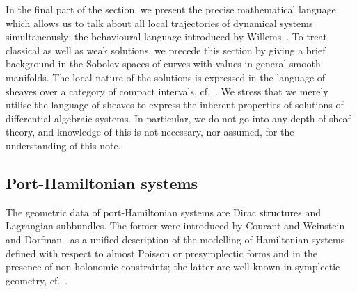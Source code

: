 \documentclass[preprint,12pt]{elsarticle}
\theoremstyle{definition}
\begin{document}
In the final part of the section, we present the precise mathematical language which allows us to talk about all local trajectories of dynamical systems simultaneously: the behavioural language introduced by Willems~\cite{Polderman}. To treat classical as well as weak solutions, we precede this section by giving a brief background in the Sobolev spaces of curves with values in general smooth manifolds. The local nature of the solutions is expressed in the language of sheaves over a category of compact intervals, cf.~\cite{SchuSPivVasi20}. We stress that we merely utilise the language of sheaves to express the inherent properties of solutions of differential-algebraic systems. In particular, we do not go into any depth of sheaf theory, and knowledge of this is not necessary, nor assumed, for the understanding of this note.

\subsection{Port-Hamiltonian systems}\label{sec:pH_repetition}

The geometric data of port-Hamiltonian systems are Dirac structures and Lagrangian subbundles. The former were introduced by Courant and Weinstein~\cite{CourWein88,Cour90} and Dorfman~\cite{Dorf87,Dorf93} as a unified description of the modelling of Hamiltonian systems defined with respect to almost Poisson or presymplectic forms and in the presence of non-holonomic constraints; the latter are well-known in symplectic geometry, cf.~\cite{LibeMarl87}.
\end{document}
